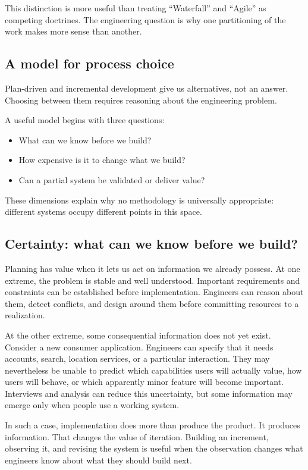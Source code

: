 This distinction is more useful than treating ``Waterfall'' and ``Agile'' as competing doctrines. The
engineering question is why one partitioning of the work makes more sense than another.

\subsection{A model for process choice}\label{sec-model-process-choice}

Plan-driven and incremental development give us alternatives, not an answer. Choosing between them requires
reasoning about the engineering problem.

A useful model begins with three questions:

\begin{itemize}
\tightlist
\item
  What can we know before we build?
\item
  How expensive is it to change what we build?
\item
  Can a partial system be validated or deliver value?
\end{itemize}

These dimensions explain why no methodology is universally appropriate: different systems occupy
different points in this space.

\subsection{Certainty: what can we know before we build?}\label{sec-certainty}

Planning has value when it lets us act on information we already possess. At one extreme, the
problem is stable and well understood. Important requirements and constraints can be established
before implementation. Engineers can reason about them, detect conflicts, and design around them
before committing resources to a realization.

At the other extreme, some consequential information does not yet exist. Consider a new consumer
application. Engineers can specify that it needs accounts, search, location
services, or a particular interaction. They may nevertheless be unable to predict which capabilities
users will actually value, how users will behave, or which apparently minor feature will become
important. Interviews and analysis can reduce this uncertainty, but some information may emerge only when
people use a working system.

In such a case, implementation does more than produce the product. It produces information. That changes
the value of iteration. Building an increment, observing it, and revising the system is useful when the
observation changes what engineers know about what they should build next.

